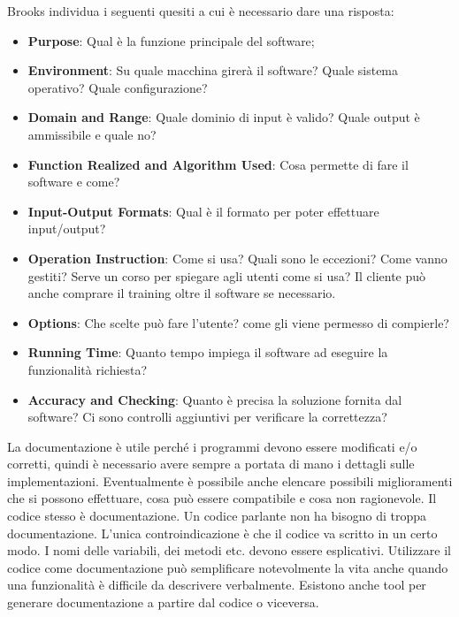 Brooks individua i seguenti quesiti a cui è necessario dare una risposta:
\begin{itemize}
	\item \textbf{Purpose}: Qual è la funzione principale del software;
	\item \textbf{Environment}: Su quale macchina girerà il software? Quale sistema operativo? Quale configurazione?
	\item \textbf{Domain and Range}: Quale dominio di input è valido? Quale output è ammissibile e quale no?
	\item \textbf{Function Realized and Algorithm Used}: Cosa permette di fare il software e come?
	\item \textbf{Input-Output Formats}: Qual è il formato per poter effettuare input/output?
	\item \textbf{Operation Instruction}: Come si usa? Quali sono le eccezioni? Come vanno gestiti? Serve un corso per spiegare agli utenti come si usa? Il cliente può anche comprare il training oltre il software se necessario.
	\item \textbf{Options}: Che scelte può fare l'utente? come gli viene permesso di compierle?
	\item \textbf{Running Time}: Quanto tempo impiega il software ad eseguire la funzionalità richiesta?
	\item \textbf{Accuracy and Checking}: Quanto è precisa la soluzione fornita dal software? Ci sono controlli aggiuntivi per verificare la correttezza?
\end{itemize}
La documentazione è utile perché i programmi devono essere modificati e/o corretti, quindi è necessario avere sempre a portata di mano i dettagli sulle implementazioni.\newline
Eventualmente è possibile anche elencare possibili miglioramenti che si possono effettuare, cosa può essere compatibile e cosa non ragionevole.\newline
Il codice stesso è documentazione. Un codice parlante non ha bisogno di troppa documentazione. L'unica controindicazione è che il codice va scritto in un certo modo. I nomi delle variabili, dei metodi etc. devono essere esplicativi. Utilizzare il codice come documentazione può semplificare notevolmente la vita anche quando una funzionalità è difficile da descrivere verbalmente. Esistono anche tool per generare documentazione a partire dal codice o viceversa.

